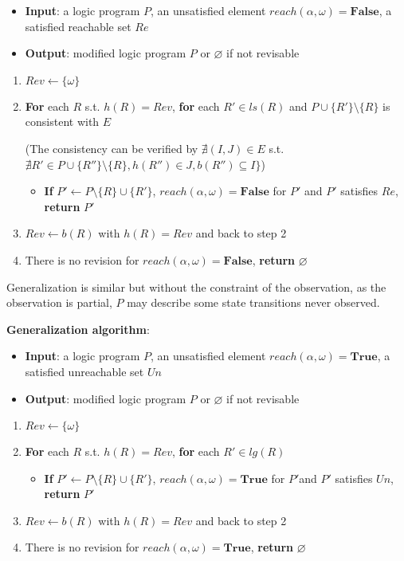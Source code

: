     \begin{itemize}
        \item \textbf{Input}: a logic program $P$, an unsatisfied element $reach(\alpha,\omega)=\mathbf{False}$, a satisfied reachable set $Re$%
        \item \textbf{Output}: modified logic program $P$ or $\varnothing$ if not revisable
    \end{itemize}
    \begin{enumerate}
        \item $Rev\gets\{\omega\}$
        \item \textbf{For} each $R$ s.t. $h(R)=Rev$, \textbf{for} each $R'\in ls(R)$ and $P\cup\{R'\}\setminus\{R\}$ is consistent with $E$
        
        (The consistency can be verified by $\nexists (I,J)\in E$ s.t. $\nexists R'\in P\cup \{R''\}\setminus \{R\}, h(R'')\in J, b(R'')\subseteq I\}$)
        \begin{itemize}
            \item \textbf{If} $P' \gets P \setminus \{R\} \cup \{R'\}$, $reach(\alpha,\omega)=\mathbf{False}$ for $P'$ and $P'$ satisfies $Re$, \textbf{return} $P'$
        \end{itemize}
        \item $Rev\gets b(R)$ with $h(R)=Rev$ and back to step 2
        \item There is no revision for $reach(\alpha,\omega)=\mathbf{False}$, \textbf{return} $\varnothing$
    \end{enumerate}
    
     Generalization is similar but without the constraint of the observation, as the observation is partial, $P$ may describe some state transitions never observed.
     
    \textbf{Generalization algorithm}:
    
    \begin{itemize}
        \item \textbf{Input}: a logic program $P$, an unsatisfied element $reach(\alpha,\omega)=\mathbf{True}$, a satisfied unreachable set $Un$
        \item \textbf{Output}: modified logic program $P$ or $\varnothing$ if not revisable
    \end{itemize}
    \begin{enumerate}
        \item $Rev\gets\{\omega\}$
        \item \textbf{For} each $R$ s.t. $h(R)=Rev$, \textbf{for} each $R'\in lg(R)$
        \begin{itemize}
            \item \textbf{If} $P' \gets P \setminus \{R\} \cup \{R'\}$, $reach(\alpha,\omega)=\mathbf{True}$ for $P'$and $P'$ satisfies $Un$, \textbf{return} $P'$
        \end{itemize}
        \item $Rev\gets b(R)$ with $h(R)=Rev$ and back to step 2
        \item There is no revision for $reach(\alpha,\omega)=\mathbf{True}$, \textbf{return} $\varnothing$
    \end{enumerate}
    
